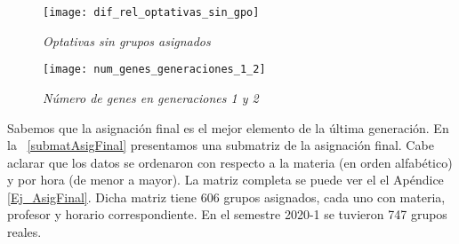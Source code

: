 \begin{figure}[H]
\centering
\texttt{[image: dif\_rel\_optativas\_sin\_gpo]} %
\caption[\textit{Optativas sin grupos asignados}]{\textit{Optativas sin grupos asignados}}
\end{figure}



\begin{figure}[H]
\centering
\texttt{[image: num\_genes\_generaciones\_1\_2]} %
\caption[\textit{Número de genes en generaciones 1 y 2}]{\textit{Número de genes en generaciones 1 y 2}}
\end{figure}



Sabemos que la asignación final es el mejor elemento de la última generación. En la \tablename{~\ref{submatAsigFinal}} presentamos una submatriz de la asignación final. Cabe aclarar que los datos se ordenaron con respecto a la materia (en orden alfabético) y por hora (de menor a mayor). La matriz completa se puede ver el el Apéndice \ref{Ej_AsigFinal}. Dicha matriz tiene 606 grupos asignados, cada uno con materia, profesor y horario correspondiente. En el semestre 2020-1 se tuvieron 747 grupos reales.



